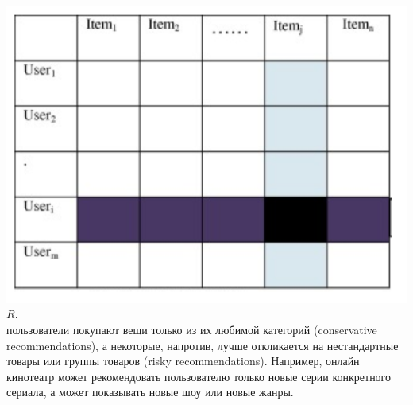 \documentclass{article}
\newcommand\tab[1][1cm]{\hspace*{#1}}
\begin{document}
 \tab\includegraphics[scale=0.6]{f2.png}\\
  $R$.\\
  пользователи покупают вещи только из их любимой категорий (conservative recommendations), а некоторые, напротив, лучше откликается на нестандартные товары или группы товаров (risky recommendations). Например, онлайн кинотеатр может рекомендовать пользователю только новые серии конкретного сериала, а может показывать новые шоу или новые жанры.\\
\end{document}
